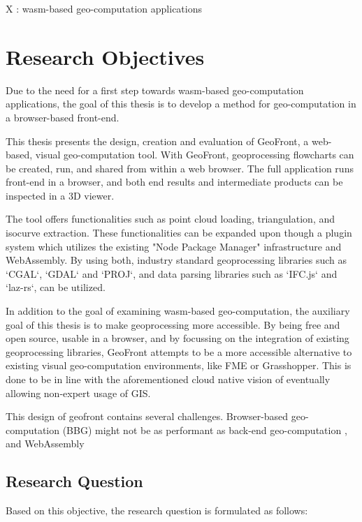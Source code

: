 X : wasm-based geo-computation applications

\section{Research Objectives}

Due to the need for a first step towards wasm-based geo-computation applications, the goal of this thesis is to develop a method for geo-computation in a browser-based front-end. 

This thesis presents the design, creation and evaluation of GeoFront, a web-based, visual geo-computation tool. 
With GeoFront, geoprocessing flowcharts can be created, run, and shared from within a web browser.  
The full application runs front-end in a browser, and both end results and intermediate products can be inspected in a 3D viewer.

The tool offers functionalities such as point cloud loading, triangulation, and isocurve extraction.
These functionalities can be expanded upon though a plugin system which utilizes the existing "Node Package Manager" infrastructure and WebAssembly.
By using both, industry standard geoprocessing libraries such as `CGAL`, `GDAL` and `PROJ`, and data parsing libraries such as `IFC.js` and `laz-rs`, can be utilized.

In addition to the goal of examining wasm-based geo-computation, the auxiliary goal of this thesis is to make geoprocessing more accessible. 
By being free and open source, usable in a browser, and by focussing on the integration of existing geoprocessing libraries, GeoFront attempts to be a more accessible alternative to existing visual geo-computation environments, like FME or Grasshopper. 
This is done to be in line with the aforementioned cloud native vision of eventually allowing non-expert usage of GIS.

This design of geofront contains several challenges. Browser-based geo-computation (BBG) might not be as performant as back-end geo-computation \cite{panidi_hybrid_2015, hamilton_client-side_2014}, and WebAssembly 


\newpage
\subsection{Research Question}
Based on this objective, the research question is formulated as follows: 

